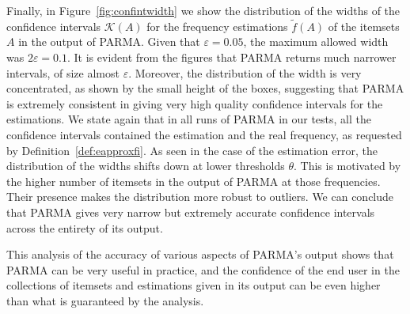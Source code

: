Finally, in Figure~\ref{fig:confintwidth} we show the distribution of the widths
of the confidence intervals $\mathcal{K}(A)$ for the frequency estimations
$\tilde{f}(A)$ of the itemsets $A$ in the output of PARMA. Given that
$\varepsilon=0.05$, the maximum allowed width was $2\varepsilon=0.1$. It is
evident from the figures that PARMA returns much narrower intervals, of size almost
$\varepsilon$. Moreover, the distribution of the width is very concentrated, as
shown by the small height of the boxes, suggesting that PARMA is extremely
consistent in giving very high quality confidence intervals for the estimations.
We state again that in all runs of PARMA in our tests, all the confidence
intervals contained the estimation and the real frequency, as requested by
Definition~\ref{def:eapproxfi}. As seen in the case of the estimation
error, the distribution of the widths shifts down at lower thresholds $\theta$.
This is motivated by the higher number of itemsets in the output of PARMA at
those frequencies. Their presence makes the distribution more robust to
outliers. We can conclude that PARMA gives very narrow but
extremely accurate confidence intervals across the entirety of its output.

This analysis of the accuracy of various aspects of PARMA's output shows that
PARMA can be very useful in practice, and the confidence of the end user in
the collections of itemsets and estimations given in its output can be even higher
than what is guaranteed by the analysis.

